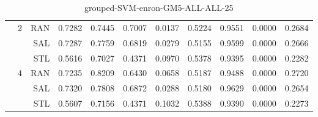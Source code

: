 \begin{center}
\begin{table}[htbp]
\begin{center}
\begin{tabular}{ | r | r | r | r | r | r | r | r | r | r | r |}
 & \multirow{3}{*}{2} & RAN & 0.7282 & 0.7445 & 0.7007 & 0.0137 & 0.5224 & 0.9551 & 0.0000 & 0.2684\\ \cline{3-11}
 &   & SAL & 0.7287 & 0.7759 & 0.6819 & 0.0279 & 0.5155 & 0.9599 & 0.0000 & 0.2666\\ \cline{3-11}
 &   & STL & 0.5616 & 0.7027 & 0.4371 & 0.0970 & 0.5378 & 0.9395 & 0.0000 & 0.2282\\ \cline{2-11}
 & \multirow{3}{*}{4} & RAN & 0.7235 & 0.8209 & 0.6430 & 0.0658 & 0.5187 & 0.9488 & 0.0000 & 0.2720\\ \cline{3-11}
 &   & SAL & 0.7320 & 0.7808 & 0.6872 & 0.0288 & 0.5180 & 0.9629 & 0.0000 & 0.2654\\ \cline{3-11}
 &   & STL & 0.5607 & 0.7156 & 0.4371 & 0.1032 & 0.5388 & 0.9390 & 0.0000 & 0.2273\\ \cline{2-11}
\hline
\end{tabular}
\caption{grouped-SVM-enron-GM5-ALL-ALL-25}
\end{center}
 \end{table}
\end{center}

